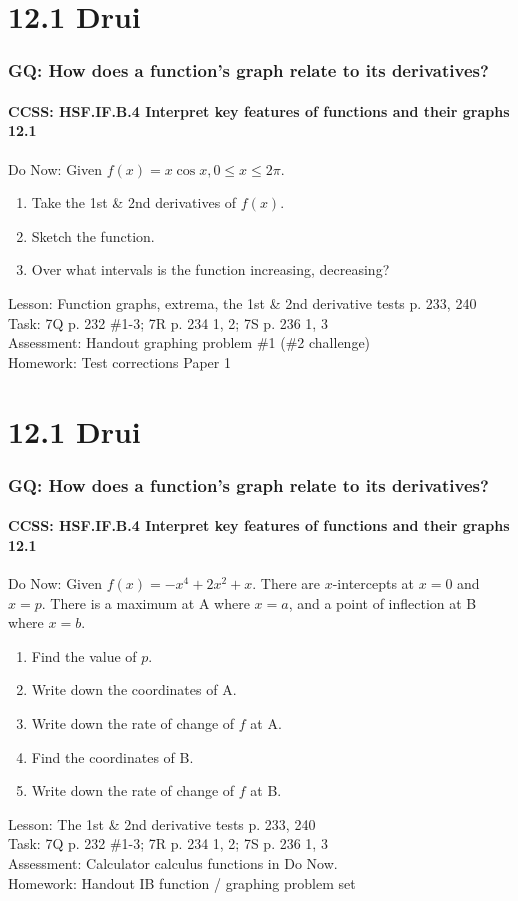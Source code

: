 \documentclass{beamer}
\begin{document}
  \section{12.1 Drui}
  \frame
  {
    \frametitle{GQ: How does a function's graph relate to its derivatives?}
    \framesubtitle{CCSS: HSF.IF.B.4 Interpret key features of functions and their graphs \qquad \alert{12.1}}

    \begin{block}{Do Now: Given $f(x)=x \cos x, 0 \leq x \leq 2\pi$.}
    \begin{enumerate}
        \item Take the 1st \& 2nd derivatives of $f(x)$. \item Sketch the function. \item Over what intervals is the function increasing, decreasing?
    \end{enumerate}
    \end{block}
    Lesson: Function graphs, extrema, the 1st \& 2nd derivative tests p. 233, 240\\%
    Task: 7Q p. 232 \#1-3; 7R p. 234 1, 2; 7S p. 236 1, 3 \\%
    Assessment: Handout graphing problem \#1 (\#2 challenge)
    \\%
    Homework: Test corrections Paper 1
  }

  \section{12.1 Drui}
  \frame
  {
    \frametitle{GQ: How does a function's graph relate to its derivatives?}
    \framesubtitle{CCSS: HSF.IF.B.4 Interpret key features of functions and their graphs \qquad \alert{12.1}}

    \begin{block}{Do Now: Given $f\left(x\right) =-x^4 +2x^2 +x$. There are $x$-intercepts at $x=0$ and $x=p$. There is a maximum at A where $x=a$, and a point of inflection at B where $x=b$.}
    \begin{enumerate}
        \item Find the value of $p$.
        \item Write down the coordinates of A.
        \item Write down the rate of change of $f$ at A.
        \item Find the coordinates of B.
        \item Write down the rate of change of $f$ at B.
    \end{enumerate}
    \end{block}
    Lesson: The 1st \& 2nd derivative tests p. 233, 240\\%
    Task: 7Q p. 232 \#1-3; 7R p. 234 1, 2; 7S p. 236 1, 3 \\%
    Assessment: Calculator calculus functions in Do Now.
    \\%
    Homework: Handout IB function / graphing problem set
  }
\end{document}
